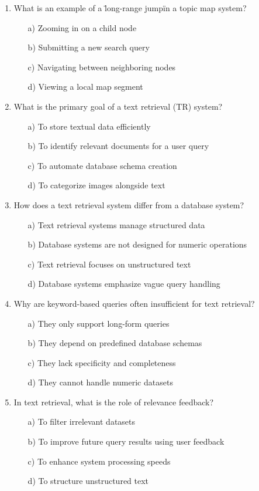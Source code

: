 \documentclass[8pt]{extarticle}
\begin{document}
\begin{multicols}{2}
\begin{enumerate}
\item What is an example of a \"long-range jump\" in a topic map system?
\begin{itemize}
    \item[a)] Zooming in on a child node
    \item[b)] Submitting a new search query
    \item[c)] Navigating between neighboring nodes
    \item[d)] Viewing a local map segment
\end{itemize}

\item What is the primary goal of a text retrieval (TR) system?
\begin{itemize}
    \item[a)] To store textual data efficiently
    \item[b)] To identify relevant documents for a user query
    \item[c)] To automate database schema creation
    \item[d)] To categorize images alongside text
\end{itemize}

\item How does a text retrieval system differ from a database system?
\begin{itemize}
    \item[a)] Text retrieval systems manage structured data
    \item[b)] Database systems are not designed for numeric operations
    \item[c)] Text retrieval focuses on unstructured text
    \item[d)] Database systems emphasize vague query handling
\end{itemize}

\item Why are keyword-based queries often insufficient for text retrieval?
\begin{itemize}
    \item[a)] They only support long-form queries
    \item[b)] They depend on predefined database schemas
    \item[c)] They lack specificity and completeness
    \item[d)] They cannot handle numeric datasets
\end{itemize}

\item In text retrieval, what is the role of relevance feedback?
\begin{itemize}
    \item[a)] To filter irrelevant datasets
    \item[b)] To improve future query results using user feedback
    \item[c)] To enhance system processing speeds
    \item[d)] To structure unstructured text
\end{itemize}


\end{enumerate}
\end{multicols}
\end{document}
